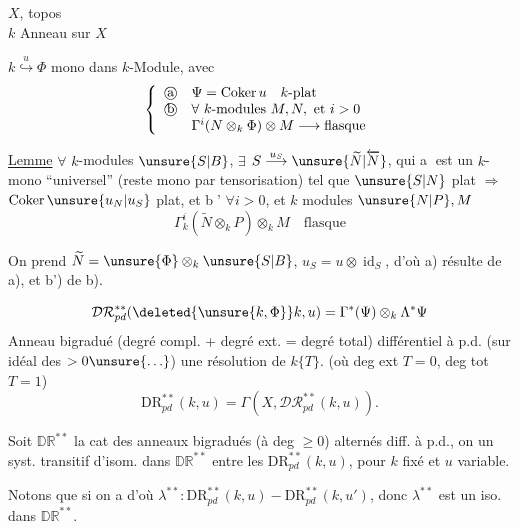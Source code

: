 $X$, topos\\
$k$ Anneau sur $X$

$k\overset{u}{\hookrightarrow}\Phi$ mono dans $k$-Module, avec
\[
\left\{\begin{array}{ll}
\text{\textcircled{a}}&\Psi=\operatorname{Coker}u\quad k\text{-plat}\\
\text{\textcircled{b}}&\forall\ k\text{-modules }M,N,\text{ et }i>0\\
&\Gamma^i(N\otimes_k\Phi)\otimes M\longrightarrow\text{flasque}
\end{array}\right.
\]

\uline{Lemme} $\forall$ $k$-modules $\unsure{S|B}$, $\exists$  $S\overset{u_S}{\longrightarrow}\unsure{\widetilde N|\overleftarrow N}$, qui \textcircled{a} est un $k$-mono ``universel'' (reste mono par tensorisation) tel que $\unsure{S|N}$ plat $\Rightarrow$ $\operatorname{Coker}\unsure{u_N|u_S}$ plat, et \textcircled{b'} $\forall i>0$, et $k$ modules $\unsure{N|P},M$
\[
\Gamma_k^i(\widetilde N\otimes_k P)\otimes_k M\quad\text{flasque}
\]


On prend $\widetilde N=\unsure{\Phi}\otimes_k\unsure{S|B}$, $u_S=u\otimes\operatorname{id}_S$, d'où a) résulte de a), et b') de b).

\[
\mathcal{DR}_{pd}^{**}(\deleted{\unsure{k,\Phi}}k,u)
=\Gamma^*(\Psi)\otimes_k\Lambda^*\Psi
\]
Anneau bigradué (degré compl. + degré ext. = degré total)
différentiel à p.d. (sur idéal des  $>0\unsure{\ldots}$) une résolution de $k\{T\}$. (où deg ext $T=0$, deg tot $T=1$)
\[
\mathrm{DR}_{pd}^{**}(k,u)=\Gamma(X,\mathcal{DR}_{pd}^{**}(k,u)).
\]

Soit $\mathbb{DR}^{**}$ la cat  des anneaux bigradués (à deg $\geq0$) alternés diff. à p.d.,  on  un syst. transitif d'isom. dans $\mathbb{DR}^{**}$ entre les $\mathrm{DR}_{pd}^{**}(k,u)$, pour $k$ fixé et $u$ variable.

Notons que si on a
d'où
$\lambda^{**}:\mathrm{DR}_{pd}^{**}(k,u)\mathbin{-}\mathrm{DR}_{pd}^{**}(k,u')$,
donc $\lambda^{**}$ est un iso. dans $\mathbb{DR}^{**}$.

